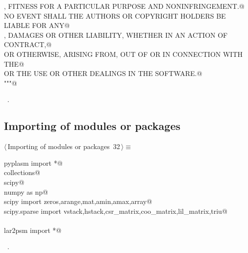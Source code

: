 \documentclass[11pt,oneside]{article}	%
\begin{document}
\begin{flushleft}
\begin{list}{}{}
\mbox{}\verb@MERCHANTABILITY, FITNESS FOR A PARTICULAR PURPOSE AND NONINFRINGEMENT.@\\
\mbox{}\verb@IN NO EVENT SHALL THE AUTHORS OR COPYRIGHT HOLDERS BE LIABLE FOR ANY@\\
\mbox{}\verb@CLAIM, DAMAGES OR OTHER LIABILITY, WHETHER IN AN ACTION OF CONTRACT,@\\
\mbox{}\verb@TORT OR OTHERWISE, ARISING FROM, OUT OF OR IN CONNECTION WITH THE@\\
\mbox{}\verb@SOFTWARE OR THE USE OR OTHER DEALINGS IN THE SOFTWARE.@\\
\mbox{}\verb@"""@\\
\mbox{}\verb@@{\NWsep}
\end{list}
\vspace{-1ex}
\footnotesize\addtolength{\baselineskip}{-1ex}
\begin{list}{}{\setlength{\itemsep}{-\parsep}\setlength{\itemindent}{-\leftmargin}}
\item \NWtxtMacroRefIn\ .
\end{list}
\end{flushleft}
\subsection{Importing of modules or packages}
\begin{flushleft} \small \label{scrap55}
\protect{}$\langle\,$Importing of modules or packages\nobreak\ {\footnotesize 32}$\,\rangle\equiv$
\vspace{-1ex}
\begin{list}{}{} \item
\mbox{}\verb@from pyplasm import *@\\
\mbox{}\verb@import collections@\\
\mbox{}\verb@import scipy@\\
\mbox{}\verb@import numpy as np@\\
\mbox{}\verb@from scipy import zeros,arange,mat,amin,amax,array@\\
\mbox{}\verb@from scipy.sparse import vstack,hstack,csr_matrix,coo_matrix,lil_matrix,triu@\\
\mbox{}\verb@@\\
\mbox{}\verb@from lar2psm import *@\\
\mbox{}\verb@@{\NWsep}
\end{list}
\vspace{-1ex}
\footnotesize\addtolength{\baselineskip}{-1ex}
\begin{list}{}{\setlength{\itemsep}{-\parsep}\setlength{\itemindent}{-\leftmargin}}
\item \NWtxtMacroRefIn\ .
\end{list}
\end{flushleft}
\end{document}
